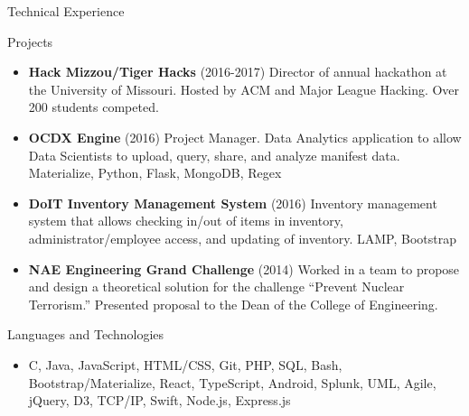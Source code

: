 \documentclass[]{mcdowellcv}
\begin{document}
    \begin{cvsection}{Technical Experience}
        \begin{cvsubsection}{Projects}{}{}
            \begin{itemize}
                \item \textbf{Hack Mizzou/Tiger Hacks} (2016-2017) Director of annual hackathon at the University of Missouri. Hosted by ACM and Major League Hacking. Over 200 students competed.
                \item \textbf{OCDX Engine} (2016) Project Manager. Data Analytics application to allow Data Scientists to upload, query, share, and analyze manifest data. Materialize, Python, Flask, MongoDB, Regex
                \item \textbf{DoIT Inventory Management System} (2016) Inventory management system that allows checking in/out of items in inventory, administrator/employee access, and updating of inventory. LAMP, Bootstrap
                \item \textbf{NAE Engineering Grand Challenge} (2014) Worked in a team to propose and design a theoretical solution for the challenge “Prevent Nuclear Terrorism.” Presented proposal to the Dean of the College of Engineering.
            \end{itemize}
        \end{cvsubsection}

        \begin{cvsubsection}{Languages and Technologies}{}{}
            \begin{itemize}
                \item C, Java, JavaScript, HTML/CSS, Git, PHP, SQL,  Bash, Bootstrap/Materialize, React, TypeScript, Android, Splunk, UML, Agile, jQuery, D3, TCP/IP, Swift, Node.js, Express.js
            \end{itemize}
        \end{cvsubsection}
    \end{cvsection}
    
\end{document}
